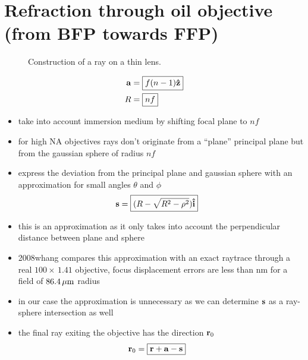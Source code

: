 \section{Refraction through oil objective (from BFP towards FFP)}
\begin{figure}[!hbt]
  \centering
  
  \caption{Construction of a ray on a thin lens.}
\end{figure}
\begin{align}
  \mathbf{a} &= \boxed{f (n-1) \mathbf{\hat{z}}} \\
  R &= \boxed{nf}
\end{align}
\begin{itemize}
\item take into account immersion medium by shifting focal plane to
  $nf$
\item for high NA objectives rays don't originate from a ``plane''
  principal plane but from the gaussian sphere of radius $nf$
\item express the deviation from the principal plane and gaussian
  sphere with an approximation for small angles $\theta$ and $\phi$
\begin{align}
  \mathbf{s} &= \boxed{(R - \sqrt{R^2-\rho^2})\mathbf{\hat{i}}}
\end{align}
\item this is an approximation as it only takes into account the
  perpendicular distance between plane and sphere
\item 2008whang compares this approximation with an exact raytrace
  through a real $100\times\,1.41$ objective, focus displacement
  errors are less than \unit[130]{nm} for a field of $\unit[86.4]{\mu
    m}$ radius
\item in our case the approximation is unnecessary as we can determine
  $\mathbf{s}$ as a ray-sphere intersection as well
\item the final ray exiting the objective has the direction $\mathbf{r}_0$
\begin{align}
  \mathbf{r}_0 &= \boxed{\mathbf{r} + \mathbf{a} - \mathbf{s}}
\end{align}
\end{itemize}
